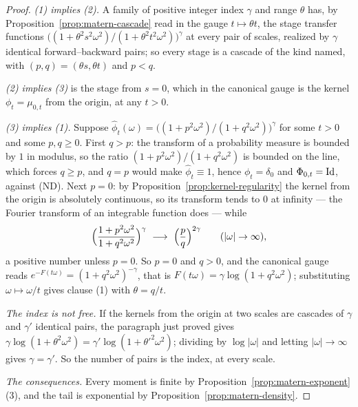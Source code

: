 \begin{proof}
\emph{(1) implies (2).} A \Matern{} family of positive integer index $\gamma$ and range $\theta$
has, by Proposition~\ref{prop:matern-cascade} read in the gauge $t \mapsto \theta t$, the stage
transfer functions $\bigl((1+\theta^2s^2\omega^2)/(1+\theta^2t^2\omega^2)\bigr)^\gamma$ at every
pair of scales, realized by $\gamma$ identical forward--backward pairs; so every stage is a
cascade of the kind named, with $(p,q) = (\theta s,\theta t)$ and $p < q$.

\emph{(2) implies (3)} is the stage from $s = 0$, which in the canonical gauge is the kernel
$\phi_t = \mu_{0,t}$ from the origin, at any $t > 0$.

\emph{(3) implies (1).} Suppose
$\hat\phi_t(\omega) = \bigl((1+p^2\omega^2)/(1+q^2\omega^2)\bigr)^\gamma$ for some $t > 0$ and
some $p,q \ge 0$. First $q > p$: the transform of a probability measure is bounded by $1$ in
modulus, so the ratio $(1+p^2\omega^2)/(1+q^2\omega^2)$ is bounded on the line, which forces
$q \ge p$, and $q = p$ would make $\hat\phi_t \equiv 1$, hence $\phi_t = \delta_0$ and
$\Phi_{0,t} = \mathrm{Id}$, against (ND). Next $p = 0$: by
Proposition~\ref{prop:kernel-regularity} the kernel from the origin is absolutely continuous, so
its transform tends to $0$ at infinity --- the Fourier transform of an integrable function does
--- while
\[
  \Bigl(\frac{1+p^2\omega^2}{1+q^2\omega^2}\Bigr)^{\gamma}
   \ \longrightarrow\ \Bigl(\frac pq\Bigr)^{2\gamma} \qquad (|\omega| \to \infty),
\]
a positive number unless $p = 0$. So $p = 0$ and $q > 0$, and the canonical gauge reads
$e^{-F(t\omega)} = (1+q^2\omega^2)^{-\gamma}$, that is
$F(t\omega) = \gamma\log(1+q^2\omega^2)$; substituting $\omega \mapsto \omega/t$ gives clause (1)
with $\theta = q/t$.

\emph{The index is not free.} If the kernels from the origin at two scales are cascades of
$\gamma$ and $\gamma'$ identical pairs, the paragraph just proved gives
$\gamma\log(1+\theta^2\omega^2) = \gamma'\log(1+\theta'^2\omega^2)$; dividing by $\log|\omega|$
and letting $|\omega| \to \infty$ gives $\gamma = \gamma'$. So the number of pairs is the index,
at every scale.

\emph{The consequences.} Every moment is finite by
Proposition~\ref{prop:matern-exponent}(3), and the tail is exponential by
Proposition~\ref{prop:matern-density}.
\end{proof}

